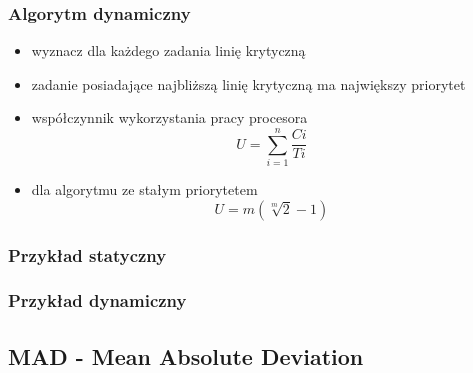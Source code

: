 \documentclass[12pt,a4paper]{article}
\begin{document}
\subsubsection{Algorytm dynamiczny}
\begin{itemize}
\item wyznacz dla każdego zadania linię krytyczną
\item zadanie posiadające najbliższą linię krytyczną ma największy priorytet
\item współczynnik wykorzystania pracy procesora
\begin{equation}
U=\sum\limits_{i=1}^{n}\frac{Ci}{Ti}
\end{equation}
\item dla algorytmu ze stałym priorytetem
\begin{equation}
U=m(\sqrt[m]{2}-1)
\end{equation}
\end{itemize}
\subsubsection{Przykład statyczny}
\subsubsection{Przykład dynamiczny}
\subsection{MAD - Mean Absolute Deviation}
\end{document}
